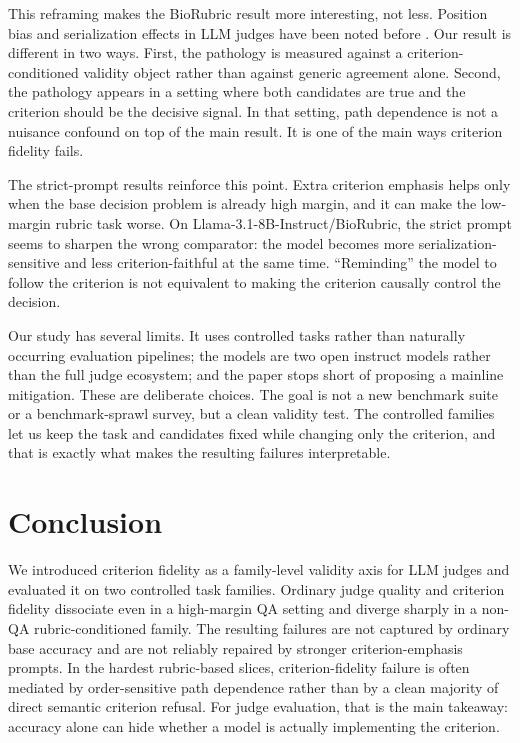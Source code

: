 \documentclass[11pt]{article}
\newcommand{\llama}{Llama-3.1-8B-Instruct\xspace}
\newcommand{\biorubric}{BioRubric\xspace}
\begin{document}
This reframing makes the BioRubric result more interesting, not less. Position bias and serialization effects in LLM judges have been noted before \citep{zheng2023judging,shi2024judging,xu2026pointwise}. Our result is different in two ways. First, the pathology is measured against a criterion-conditioned validity object rather than against generic agreement alone. Second, the pathology appears in a setting where both candidates are true and the criterion should be the decisive signal. In that setting, path dependence is not a nuisance confound on top of the main result. It is one of the main ways criterion fidelity fails.

The strict-prompt results reinforce this point. Extra criterion emphasis helps only when the base decision problem is already high margin, and it can make the low-margin rubric task worse. On \llama/\biorubric, the strict prompt seems to sharpen the wrong comparator: the model becomes more serialization-sensitive and less criterion-faithful at the same time. ``Reminding'' the model to follow the criterion is not equivalent to making the criterion causally control the decision.

Our study has several limits. It uses controlled tasks rather than naturally occurring evaluation pipelines; the models are two open instruct models rather than the full judge ecosystem; and the paper stops short of proposing a mainline mitigation. These are deliberate choices. The goal is not a new benchmark suite or a benchmark-sprawl survey, but a clean validity test. The controlled families let us keep the task and candidates fixed while changing only the criterion, and that is exactly what makes the resulting failures interpretable.

\section{Conclusion}
We introduced criterion fidelity as a family-level validity axis for LLM judges and evaluated it on two controlled task families. Ordinary judge quality and criterion fidelity dissociate even in a high-margin QA setting and diverge sharply in a non-QA rubric-conditioned family. The resulting failures are not captured by ordinary base accuracy and are not reliably repaired by stronger criterion-emphasis prompts. In the hardest rubric-based slices, criterion-fidelity failure is often mediated by order-sensitive path dependence rather than by a clean majority of direct semantic criterion refusal. For judge evaluation, that is the main takeaway: accuracy alone can hide whether a model is actually implementing the criterion.
\end{document}
